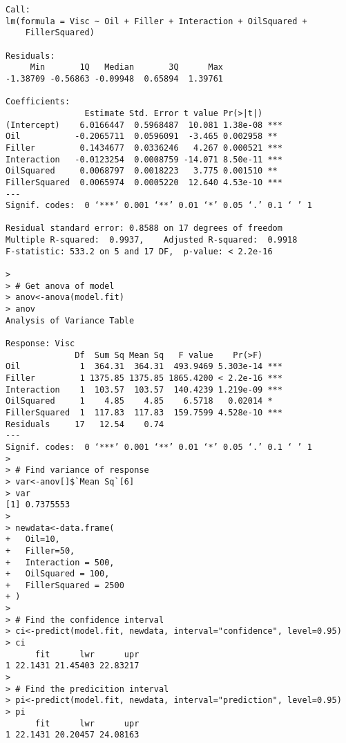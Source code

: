 \documentclass[12pt]{article}
\begin{document}
\begin{lstlisting}[caption={Quadratic regression summary results},label={R_quad_analysis}]
Call:
lm(formula = Visc ~ Oil + Filler + Interaction + OilSquared +
    FillerSquared)

Residuals:
     Min       1Q   Median       3Q      Max
-1.38709 -0.56863 -0.09948  0.65894  1.39761

Coefficients:
                Estimate Std. Error t value Pr(>|t|)
(Intercept)    6.0166447  0.5968487  10.081 1.38e-08 ***
Oil           -0.2065711  0.0596091  -3.465 0.002958 **
Filler         0.1434677  0.0336246   4.267 0.000521 ***
Interaction   -0.0123254  0.0008759 -14.071 8.50e-11 ***
OilSquared     0.0068797  0.0018223   3.775 0.001510 **
FillerSquared  0.0065974  0.0005220  12.640 4.53e-10 ***
---
Signif. codes:  0 ‘***’ 0.001 ‘**’ 0.01 ‘*’ 0.05 ‘.’ 0.1 ‘ ’ 1

Residual standard error: 0.8588 on 17 degrees of freedom
Multiple R-squared:  0.9937,	Adjusted R-squared:  0.9918
F-statistic: 533.2 on 5 and 17 DF,  p-value: < 2.2e-16

>
> # Get anova of model
> anov<-anova(model.fit)
> anov
Analysis of Variance Table

Response: Visc
              Df  Sum Sq Mean Sq   F value    Pr(>F)
Oil            1  364.31  364.31  493.9469 5.303e-14 ***
Filler         1 1375.85 1375.85 1865.4200 < 2.2e-16 ***
Interaction    1  103.57  103.57  140.4239 1.219e-09 ***
OilSquared     1    4.85    4.85    6.5718   0.02014 *
FillerSquared  1  117.83  117.83  159.7599 4.528e-10 ***
Residuals     17   12.54    0.74
---
Signif. codes:  0 ‘***’ 0.001 ‘**’ 0.01 ‘*’ 0.05 ‘.’ 0.1 ‘ ’ 1
>
> # Find variance of response
> var<-anov[]$`Mean Sq`[6]
> var
[1] 0.7375553
>
> newdata<-data.frame(
+   Oil=10,
+   Filler=50,
+   Interaction = 500,
+   OilSquared = 100,
+   FillerSquared = 2500
+ )
>
> # Find the confidence interval
> ci<-predict(model.fit, newdata, interval="confidence", level=0.95)
> ci
      fit      lwr      upr
1 22.1431 21.45403 22.83217
>
> # Find the predicition interval
> pi<-predict(model.fit, newdata, interval="prediction", level=0.95)
> pi
      fit      lwr      upr
1 22.1431 20.20457 24.08163
\end{lstlisting}
\end{document}
